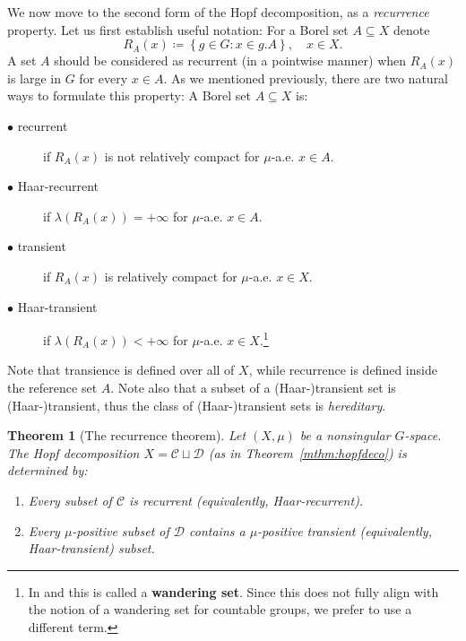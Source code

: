 \documentclass{amsart}
\numberwithin{equation}{subsection}
\newtheorem{mainthm}{Theorem}
\begin{document}
We now move to the second form of the Hopf decomposition, as a \emph{recurrence} property. Let us first establish useful notation: For a Borel set \(A\subseteq X\) denote
\[R_{A}\left(x\right)\coloneqq \left\{g\in G:x\in g.A\right\},\quad x\in X.\]
A set \(A\) should be considered as recurrent (in a pointwise manner) when \(R_{A}\left(x\right)\) is large in \(G\) for every \(x\in A\). As we mentioned previously, there are two natural ways to formulate this property: A Borel set \(A\subseteq X\) is:
\begin{description}
    \item[\(\bullet\) recurrent] if \(R_{A}\left(x\right)\) is not relatively compact for \(\mu\)-a.e. \(x\in A\).
    \item[\(\bullet\) Haar-recurrent] if \(\lambda\left(R_{A}\left(x\right)\right)=+\infty\) for \(\mu\)-a.e. \(x\in A\).
    \item[\(\bullet\) transient] if \(R_{A}\left(x\right)\) is relatively compact for \(\mu\)-a.e. \(x\in X\).
    \item[\(\bullet\) Haar-transient] if \(\lambda\left(R_{A}\left(x\right)\right)<+\infty\) for \(\mu\)-a.e. \(x\in X\).\footnote{In \cite[\S4.6 p.40]{quint2006overview} and \cite[\S1E]{Roblin2003} this is called a {\bf wandering set}. Since this does not fully align with the notion of a wandering set for countable groups, we prefer to use a different term.}
\end{description}

Note that transience is defined over all of \(X\), while recurrence is defined inside the reference set \(A\). Note also that a subset of a (Haar-)transient set is (Haar-)transient, thus the class of (Haar-)transient sets is \emph{hereditary}.

\begin{mainthm}[The recurrence theorem]
\label{mthm:recurrence}
Let \(\left(X,\mu\right)\) be a nonsingular \(G\)-space. The Hopf decomposition \(X=\mathcal{C}\sqcup\mathcal{D}\) (as in Theorem~\ref{mthm:hopfdeco}) is determined by:
\begin{enumerate}
    \item Every subset of \(\mathcal{C}\) is recurrent (equivalently, Haar-recurrent).
    \item Every \(\mu\)-positive subset of \(\mathcal{D}\) contains a \(\mu\)-positive transient (equivalently, Haar-transient) subset.
\end{enumerate}
\end{mainthm}
\end{document}
